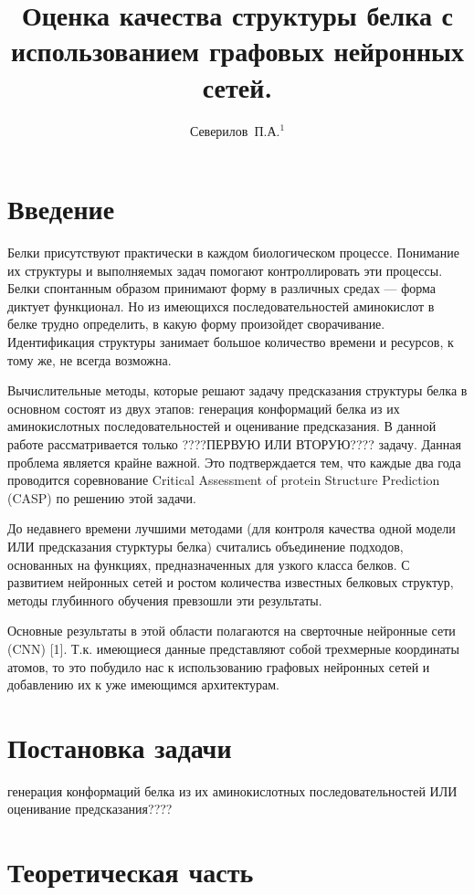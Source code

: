 \documentclass[12pt,twosides]{article}
\title
[Качество структуры белка с  графовыми сетями]
{Оценка качества структуры белка с использованием графовых нейронных сетей.}
\author
[Северилов~П.А.] 
{Северилов~П.А.$^1$}
\begin{document}
	\maketitle
	
	\section{Введение}
	
	Белки присутствуют практически в каждом биологическом процессе. Понимание их структуры и выполняемых задач помогают контроллировать эти процессы. Белки спонтанным образом принимают форму в различных средах — форма диктует функционал. Но из имеющихся последовательностей аминокислот в белке трудно определить, в какую форму произойдет сворачивание. Идентификация структуры занимает большое количество времени и ресурсов, к тому же, не всегда возможна. 
	
	Вычислительные методы, которые решают задачу предсказания структуры белка в основном состоят из двух этапов: генерация конформаций белка из их аминокислотных последовательностей и оценивание предсказания. В данной работе рассматривается только ????ПЕРВУЮ ИЛИ ВТОРУЮ???? задачу. Данная проблема является крайне важной. Это подтверждается тем, что каждые два года проводится соревнование Critical Assessment of protein Structure Prediction (CASP) по решению этой задачи.
	
	До недавнего времени лучшими методами (для контроля качества одной модели ИЛИ предсказания стурктуры белка) считались объединение подходов, основанных на функциях, предназначенных для узкого класса белков. С развитием нейронных сетей и ростом количества известных белковых структур, методы глубинного обучения превзошли эти результаты.
	
	Основные результаты в этой области полагаются на сверточные нейронные сети (CNN) [1]. Т.к. имеющиеся данные представляют собой трехмерные координаты атомов, то это побудило нас к использованию графовых нейронных сетей и добавлению их к уже имеющимся архитектурам.
	
	
	
	\section{Постановка задачи}
	генерация конформаций белка из их аминокислотных последовательностей ИЛИ оценивание предсказания????
	
	
	\section{Теоретическая часть}
	
\end{document}
